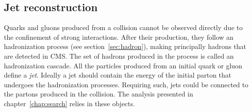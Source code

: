 %
%
%
%

\subsection{Jet reconstruction}
\label{sec:jets}

Quarks and gluons produced from a collision cannot be observed directly due to the confinement of strong interactions. After their production, they follow an hadronization process (see section~\ref{sec:hadron}), making principally hadrons that are detected in CMS. The set of hadrons produced in the process is called an hadronization cascade. All the particles produced from an initial quark or gluon define a \textit{jet}. Ideally a jet should contain the energy of the initial parton that undergoes the hadronization processes. Requiring such, jets could be connected to the partons produced in the collision. The analysis presented in chapter~\ref{chap:search} relies in these objects.

